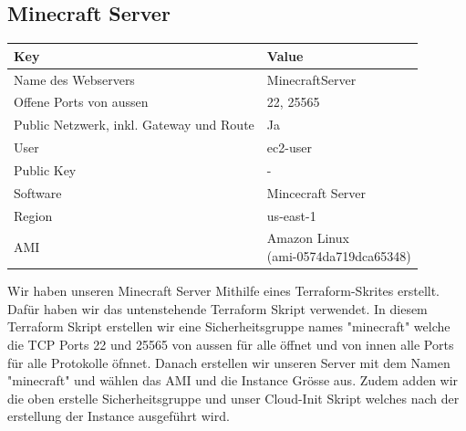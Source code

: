 \documentclass{article}
\begin{document}
\subsection{Minecraft Server}

\begin{center}

\begin{tabular}{|l|l|}
\hline
\textbf{Key} & \textbf{Value} \\ \hline
Name des Webservers & MinecraftServer \\ \hline
Offene Ports von aussen & 22, 25565 \\ \hline
Public Netzwerk, inkl. Gateway und Route & Ja \\ \hline
User & ec2-user \\ \hline
Public Key & - \\ \hline
Software & Mincecraft Server \\ \hline
Region & us-east-1 \\ \hline
AMI & \makecell{Amazon Linux \\ (ami-0574da719dca65348)} \\ \hline
\end{tabular}

\end{center}

\vspace{10pt}

\noindent Wir haben unseren Minecraft Server Mithilfe eines Terraform-Skrites erstellt. Dafür haben wir das untenstehende Terraform Skript verwendet. In diesem Terraform Skript erstellen wir eine Sicherheitsgruppe names "minecraft" welche die TCP Ports 22 und 25565 von aussen für alle öffnet und von innen alle Ports für alle Protokolle öfnnet. Danach erstellen wir unseren Server mit dem Namen "minecraft" und wählen das AMI und die Instance Grösse aus. Zudem adden wir die oben erstelle Sicherheitsgruppe und unser Cloud-Init Skript welches nach der erstellung der Instance ausgeführt wird.

\vspace{30pt}
\end{document}
